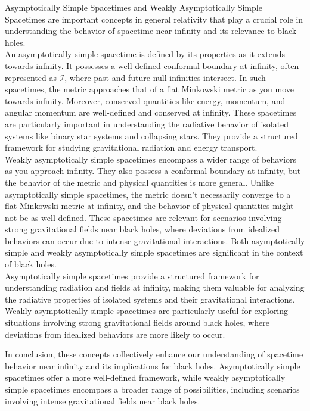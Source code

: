 Asymptotically Simple Spacetimes and Weakly Asymptotically Simple Spacetimes are important concepts in general relativity that play a crucial role in understanding the behavior of spacetime near infinity and its relevance to black holes.\\
\noindent
An asymptotically simple spacetime is defined by its properties as it extends towards infinity. It possesses a well-defined conformal boundary at infinity, often represented as $\mathcal{I}$, where past and future null infinities intersect. In such spacetimes, the metric approaches that of a flat Minkowski metric as you move towards infinity. Moreover, conserved quantities like energy, momentum, and angular momentum are well-defined and conserved at infinity. These spacetimes are particularly important in understanding the radiative behavior of isolated systems like binary star systems and collapsing stars. They provide a structured framework for studying gravitational radiation and energy transport.\\
\noindent
Weakly asymptotically simple spacetimes encompass a wider range of behaviors as you approach infinity. They also possess a conformal boundary at infinity, but the behavior of the metric and physical quantities is more general. Unlike asymptotically simple spacetimes, the metric doesn't necessarily converge to a flat Minkowski metric at infinity, and the behavior of physical quantities might not be as well-defined. These spacetimes are relevant for scenarios involving strong gravitational fields near black holes, where deviations from idealized behaviors can occur due to intense gravitational interactions.
Both asymptotically simple and weakly asymptotically simple spacetimes are significant in the context of black holes.\\
\noindent
Asymptotically simple spacetimes provide a structured framework for understanding radiation and fields at infinity, making them valuable for analyzing the radiative properties of isolated systems and their gravitational interactions.\\
\noindent
Weakly asymptotically simple spacetimes are particularly useful for exploring situations involving strong gravitational fields around black holes, where deviations from idealized behaviors are more likely to occur.

In conclusion, these concepts collectively enhance our understanding of spacetime behavior near infinity and its implications for black holes. Asymptotically simple spacetimes offer a more well-defined framework, while weakly asymptotically simple spacetimes encompass a broader range of possibilities, including scenarios involving intense gravitational fields near black holes.
  
